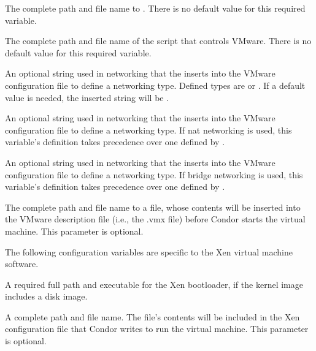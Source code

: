 \begin{description}
\label{param:VMwarePerl}
\item[\Macro{VMWARE\_PERL}]
  The complete path and file name to .
  There is no default value for this required variable.

\label{param:VMwareScript}
\item[\Macro{VMWARE\_SCRIPT}]
  The complete path and file name of the script that controls VMware.
  There is no default value for this required variable.

\label{param:VMwareNetworkingType}
\item[\Macro{VMWARE\_NETWORKING\_TYPE}]
  An optional string used in networking that the 
  inserts into the VMware configuration file to define a networking type.
  Defined types are  or .
  If a default value is needed, the inserted string will be .

\label{param:VMwareNatNetworkingType}
\item[\Macro{VMWARE\_NAT\_NETWORKING\_TYPE}]
  An optional string used in networking that the 
  inserts into the VMware configuration file to define a networking type.
  If nat networking is used, this variable's definition takes
  precedence over one defined by .

\label{param:VMwareBridgeNetworkingType}
\item[\Macro{VMWARE\_BRIDGE\_NETWORKING\_TYPE}]
  An optional string used in networking that the 
  inserts into the VMware configuration file to define a networking type.
  If bridge networking is used, this variable's definition takes
  precedence over one defined by .

\label{param:VMwareLocalSettingsFile}
\item[\Macro{VMWARE\_LOCAL\_SETTINGS\_FILE}]
  The complete path and file name to a file, whose contents will be
  inserted into the VMware description file (i.e., the .vmx file) before
  Condor starts the virtual machine. This parameter is optional.

\end{description}

The following configuration variables are specific to the Xen
virtual machine software.

\begin{description}

\label{param:XenBootloader}
\item[\Macro{XEN\_BOOTLOADER}]
  A required full path and executable for the Xen bootloader,
  if the kernel image includes a disk image.

\label{param:XenLocalSettingsFile}
\item[\Macro{XEN\_LOCAL\_SETTINGS\_FILE}]
  A complete path and file name. The file's contents will be included in
  the Xen configuration file that Condor writes to run the virtual machine.
  This parameter is optional.

\end{description}

